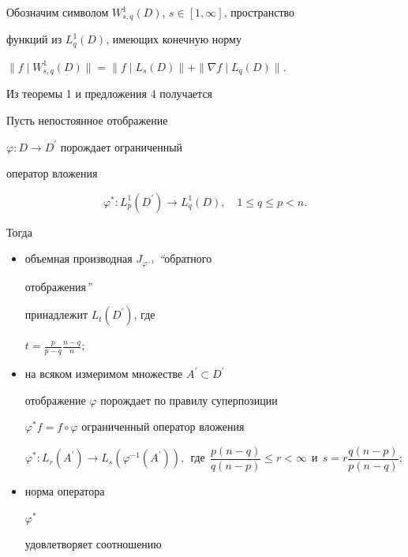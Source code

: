 Обозначим символом $W^1_{s,q}(D)$, $s\in[1,\infty]$, пространство


функций из $L^1_{q}(D)$, имеющих конечную норму


$\|f\mid W^1_{s,q}(D)\|=\|f\mid L_s(D)\|+\|\nabla f\mid L_q(D)\|$.





Из теоремы 1 и предложения 4 получается





\begin{thm}


Пусть непостоянное отображение


$\varphi : D\to D^{\prime}$ порождает ограниченный


оператор вложения


$$


\varphi^{\ast} : L^1_p(D^{\prime})\to


L^1_q(D), \quad 1\leq q\leq p<n.


$$


Тогда


\begin{itemize}


\item[1)] объемная производная $J_{\varphi^{-1}}$ {\em ``}обратного


отображения{\em ''}


принадлежит $L_t(D^{\prime})$, где


$t=\frac{p}{p-q}\frac{n-q}{n};$


\item[2)] на всяком измеримом множестве $A^{\prime}\subset D^{\prime}$


отображение $\varphi$ порождает по правилу суперпозиции


$\varphi^{\ast} f = f\circ\varphi$ ограниченный оператор вложения


$$


\varphi^{\ast}: L_r(A^{\prime})\to L_s(\varphi^{-1}(A^{\prime})),


\ \ \text{где} \ \ \frac{p(n-q)}{q(n-p)}\leq r<\infty


\ \ \text{и}\ \ s=r \frac{q(n-p)}{p(n-q)};


$$


\item[3)] норма оператора


$\varphi^{\ast}$


удовлетворяет соотношению



\end{itemize}
\end{thm}
